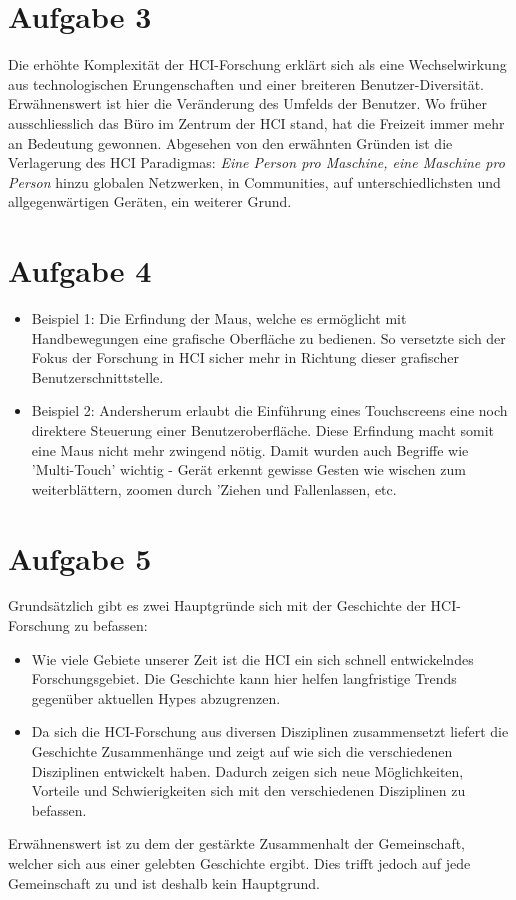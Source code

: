 \documentclass{article}
\begin{document}
    \section{Aufgabe 3}
    Die erhöhte Komplexität der HCI-Forschung erklärt sich als eine
    Wechselwirkung aus technologischen Erungenschaften und einer breiteren
    Benutzer-Diversität. Erwähnenswert ist hier die Veränderung des Umfelds der
    Benutzer. Wo früher ausschliesslich das Büro im Zentrum der HCI stand, hat
    die Freizeit immer mehr an Bedeutung gewonnen. Abgesehen von den erwähnten
    Gründen ist die Verlagerung des HCI Paradigmas: \textit{Eine Person pro
    Maschine, eine Maschine pro Person} hinzu globalen Netzwerken, in
    Communities, auf unterschiedlichsten und allgegenwärtigen Geräten, ein
    weiterer Grund.

    \section{Aufgabe 4}
    \begin{itemize}
        \item Beispiel 1: Die Erfindung der Maus, welche es ermöglicht mit Handbewegungen
        eine grafische Oberfläche zu bedienen. So versetzte sich der Fokus der Forschung in HCI
        sicher mehr in Richtung dieser grafischer Benutzerschnittstelle.

        \item Beispiel 2: Andersherum erlaubt die Einführung eines Touchscreens eine
        noch direktere Steuerung einer Benutzeroberfläche. Diese Erfindung macht somit eine 
        Maus nicht mehr zwingend nötig. Damit wurden auch Begriffe wie 'Multi-Touch' wichtig -
        Gerät erkennt gewisse Gesten wie wischen zum weiterblättern, zoomen durch 'Ziehen und Fallenlassen, etc. 
        
    \end{itemize}

    \section{Aufgabe 5}
    Grundsätzlich gibt es zwei Hauptgründe sich mit der Geschichte der
    HCI-Forschung zu befassen:
    \begin{itemize}
      \item Wie viele Gebiete unserer Zeit ist die HCI ein sich schnell
        entwickelndes Forschungsgebiet. Die Geschichte kann hier helfen
        langfristige Trends gegenüber aktuellen Hypes abzugrenzen. 
      \item Da sich die HCI-Forschung aus diversen Disziplinen zusammensetzt
        liefert die Geschichte Zusammenhänge und zeigt auf wie sich die
        verschiedenen Disziplinen entwickelt haben. Dadurch zeigen sich neue
        Möglichkeiten, Vorteile und Schwierigkeiten sich mit den verschiedenen
        Disziplinen zu befassen.
    \end{itemize}
    Erwähnenswert ist zu dem der gestärkte Zusammenhalt der Gemeinschaft,
    welcher sich aus einer gelebten Geschichte ergibt. Dies trifft jedoch auf
    jede Gemeinschaft zu und ist deshalb kein Hauptgrund.
\end{document}
